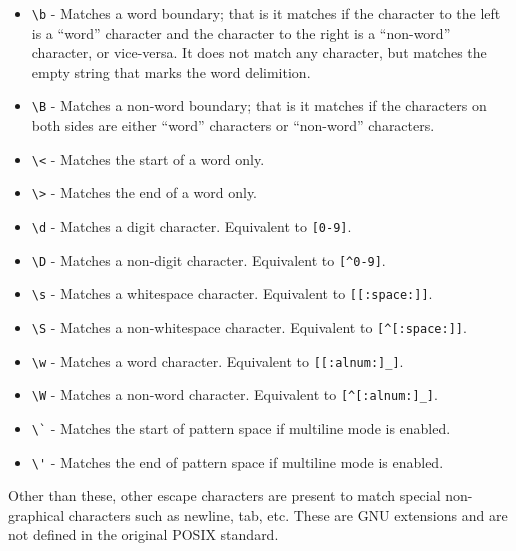\begin{itemize}
  \item \lstinline|\b| - Matches a word boundary; that is it matches if the character to the left is a “word” character and the character to the right is a “non-word” character, or vice-versa. It does not match any character, but matches the empty string that marks the word delimition.
  \item \lstinline|\B| - Matches a non-word boundary; that is it matches if the characters on both sides are either “word” characters or “non-word” characters.
  \item \lstinline|\<| - Matches the start of a word only.
  \item \lstinline|\>| - Matches the end of a word only.
  \item \lstinline|\d| - Matches a digit character. Equivalent to \lstinline|[0-9]|.
  \item \lstinline|\D| - Matches a non-digit character. Equivalent to \lstinline|[^0-9]|.
  \item \lstinline|\s| - Matches a whitespace character. Equivalent to \lstinline|[[:space:]]|.
  \item \lstinline|\S| - Matches a non-whitespace character. Equivalent to \lstinline|[^[:space:]]|.
  \item \lstinline|\w| - Matches a word character. Equivalent to \lstinline|[[:alnum:]_]|.
  \item \lstinline|\W| - Matches a non-word character. Equivalent to \lstinline|[^[:alnum:]_]|.
  \item \lstinline|\`| - Matches the start of pattern space if multiline mode is enabled.
  \item \lstinline|\'| - Matches the end of pattern space if multiline mode is enabled.
\end{itemize}

Other than these, other escape characters are present to match special non-graphical characters such as newline, tab, etc. These are GNU extensions and are not defined in the original POSIX standard.

